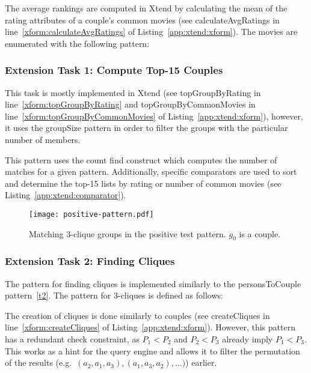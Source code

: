 The average rankings are computed in Xtend by calculating the mean of the \textsf{rating} attributes of a couple's common movies (see \textsf{calculateAvgRatings} in line~\ref{xform:calculateAvgRatings} of Listing~\ref{app:xtend:xform}). The movies are enumerated with the following pattern:


\subsubsection{Extension Task 1: Compute Top-15 Couples}
\label{et1}

This task is mostly implemented in Xtend (see \textsf{topGroupByRating} in line~\ref{xform:topGroupByRating} and \textsf{topGroupByCommonMovies} in line~\ref{xform:topGroupByCommonMovies} of Listing~\ref{app:xtend:xform}), however, it uses the \textsf{groupSize} pattern in order to filter the groups with the particular number of members.


This pattern uses the \textsf{count find} construct which computes the number of matches for a given pattern. 
Additionally, specific comparators are used to sort and determine the top-15 lists by rating or number of common movies (see Listing~\ref{app:xtend:comparator}). 

\begin{wrapfigure}{r}{0.4\textwidth}
  \vspace{-48pt}
  \begin{center}
	\texttt{[image: positive-pattern.pdf]}
  \end{center}
  \caption{Matching 3-clique groups in the positive test pattern. $g_0$ is a couple.}\label{fig:positive-pattern}
\end{wrapfigure}

\subsubsection{Extension Task 2: Finding Cliques}
\label{et2}

The pattern for finding cliques is implemented similarly to the \textsf{personsToCouple} pattern~\ref{t2}. The pattern for 3-cliques is defined as follows:


The creation of cliques is done similarly to couples (see \textsf{createCliques} in line~\ref{xform:createCliques} of Listing~\ref{app:xtend:xform}). However, this pattern has a redundant check constraint, as $P_1 < P_2$ and $P_2 < P_3$ already imply $P_1 < P_3$. This works as a hint for the query engine and allows it to filter the permutation of the results (e.g.\ $(a_2, a_1, a_3), (a_1, a_3, a_2), \ldots)$) earlier.


